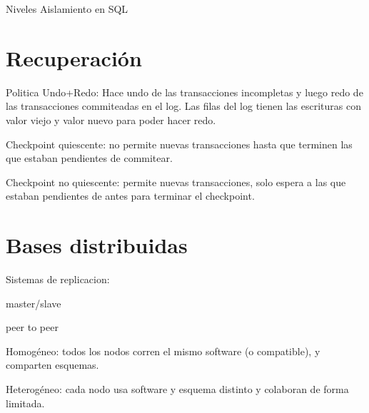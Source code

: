 Niveles Aislamiento en SQL

\section{Recuperación}

Politica Undo+Redo: Hace undo de las transacciones incompletas y luego redo de las transacciones commiteadas en el log. Las filas del log tienen las escrituras con valor viejo y valor nuevo para poder hacer redo.

Checkpoint quiescente: no permite nuevas transacciones hasta que terminen las que estaban pendientes de commitear.

Checkpoint no quiescente: permite nuevas transacciones, solo espera a las que estaban pendientes de antes para terminar el checkpoint.

\section{Bases distribuidas}

Sistemas de replicacion:

master/slave

peer to peer

Homogéneo: todos los nodos corren el mismo software (o compatible), y comparten esquemas.

Heterogéneo: cada nodo usa software y esquema distinto y colaboran de forma limitada.
